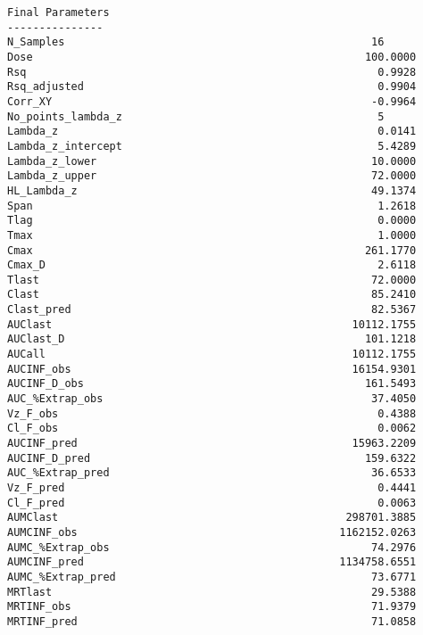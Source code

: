 \documentclass[12pt,a4paper]{article}
\begin{document}
\begin{verbatim}
Final Parameters
---------------
N_Samples                                                16
Dose                                                    100.0000
Rsq                                                       0.9928
Rsq_adjusted                                              0.9904
Corr_XY                                                  -0.9964
No_points_lambda_z                                        5
Lambda_z                                                  0.0141
Lambda_z_intercept                                        5.4289
Lambda_z_lower                                           10.0000
Lambda_z_upper                                           72.0000
HL_Lambda_z                                              49.1374
Span                                                      1.2618
Tlag                                                      0.0000
Tmax                                                      1.0000
Cmax                                                    261.1770
Cmax_D                                                    2.6118
Tlast                                                    72.0000
Clast                                                    85.2410
Clast_pred                                               82.5367
AUClast                                               10112.1755
AUClast_D                                               101.1218
AUCall                                                10112.1755
AUCINF_obs                                            16154.9301
AUCINF_D_obs                                            161.5493
AUC_%Extrap_obs                                          37.4050
Vz_F_obs                                                  0.4388
Cl_F_obs                                                  0.0062
AUCINF_pred                                           15963.2209
AUCINF_D_pred                                           159.6322
AUC_%Extrap_pred                                         36.6533
Vz_F_pred                                                 0.4441
Cl_F_pred                                                 0.0063
AUMClast                                             298701.3885
AUMCINF_obs                                         1162152.0263
AUMC_%Extrap_obs                                         74.2976
AUMCINF_pred                                        1134758.6551
AUMC_%Extrap_pred                                        73.6771
MRTlast                                                  29.5388
MRTINF_obs                                               71.9379
MRTINF_pred                                              71.0858




\end{verbatim}
\end{document}
